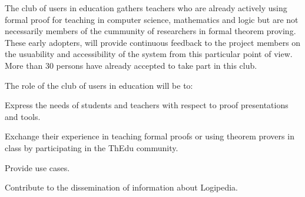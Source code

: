 \begin{workpackage}[id=dissemination,type=MGT,
  short={Dissemination},
  title={Dissemination, communication and exploitation},
  lead=Inr,InrRM=12,BirRM=4,IrtRM=4,ImtRM=2,StrRM=2,ZibRM=14,EduRM=12]
\begin{tasklist}
  \begin{task}[id=teachers-club,
      title=Expanding the use of Logipedia in education,
      lead=Str,StrRM=2,wphases=7-42!.05] The club of users in education gathers
    teachers who are already actively using formal proof for teaching
    in computer science, mathematics and logic but are not necessarily
    members of the cummunity of researchers in formal theorem
    proving. These early adopters, will provide continuous feedback to
    the project members on the usuability and accessibility of the
    system from this particular point of view.  More than 30 persons
    have already accepted to take part in this club.



    The role of the club of users in education will be to:
    \begin{compactitem}
    \item Express the needs of students and teachers with respect to proof
      presentations and tools.
    \item Exchange their experience in teaching formal proofs or using
      theorem provers in class by participating in the ThEdu community.
    \item Provide use cases.
    \item Contribute to the dissemination of information about Logipedia.
    \end{compactitem}


\end{task}
\end{tasklist}
\end{workpackage}
